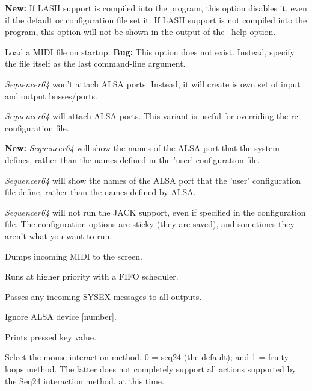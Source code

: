      \textbf{New:}
      If LASH support is compiled into the program, this option
      disables it, even if the default or configuration file set it.
      If LASH support is not compiled into the program, this option will not
      be shown in the output of the --help option.

      Load a MIDI file on startup.
      \textbf{Bug:}
      This option does not exist.
      Instead, specify the file itself as the last command-line argument.

      \textsl{Sequencer64} won't attach ALSA ports.
      Instead, it will create is own set of input and output busses/ports.

      \textsl{Sequencer64} will attach ALSA ports.
      This variant is useful for overriding the rc configuration file.

      \textbf{New:}
      \textsl{Sequencer64} will show the names of the ALSA port that the system
      defines, rather than the names defined in the 'user' configuration file.

      \textsl{Sequencer64} will show the names of the ALSA port that the 'user'
      configuration file define, rather than the names defined by ALSA.

      \textsl{Sequencer64} will not run the JACK support, even if specified
      in the configuration file.  The configuration options are sticky (they
      are saved), and sometimes they aren't what you want to run.

      Dumps incoming MIDI to the screen.

      Runs at higher priority with a FIFO scheduler.

      Passes any incoming SYSEX messages to all outputs.

      Ignore ALSA device [number].

      Prints pressed key value.

      Select the mouse interaction method.
      0 = seq24 (the default); and 1 = fruity loops method.
      The latter does not completely support all actions supported by the Seq24
      interaction method, at this time.

